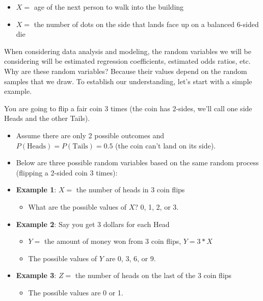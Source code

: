 \documentclass[
]{book}
\providecommand{\tightlist}{%
  \setlength{\itemsep}{0pt}\setlength{\parskip}{0pt}}
\begin{document}
\begin{itemize}
\tightlist
\item
  \(X =\) age of the next person to walk into the building
\item
  \(X =\) the number of dots on the side that lands face up on a balanced 6-sided die
\end{itemize}

When considering data analysis and modeling, the random variables we will be considering will be estimated regression coefficients, estimated odds ratios, etc. Why are these random variables? Because their values depend on the random samples that we draw. To establish our understanding, let's start with a simple example.

You are going to flip a fair coin 3 times (the coin has 2-sides, we'll call one side Heads and the other Tails).

\begin{itemize}
\item
  Assume there are only 2 possible outcomes and \(P(\text{Heads}) = P(\text{Tails}) = 0.5\) (the coin can't land on its side).
\item
  Below are three possible random variables based on the same random process (flipping a 2-sided coin 3 times):
\item
  \textbf{Example 1}: \(X =\) the number of heads in 3 coin flips

  \begin{itemize}
  \tightlist
  \item
    What are the possible values of \(X\)? 0, 1, 2, or 3.
  \end{itemize}
\item
  \textbf{Example 2}: Say you get 3 dollars for each Head

  \begin{itemize}
  \tightlist
  \item
    \(Y =\) the amount of money won from 3 coin flips, \(Y = 3*X\)
  \item
    The possible values of \(Y\) are 0, 3, 6, or 9.
  \end{itemize}
\item
  \textbf{Example 3}: \(Z =\) the number of heads on the last of the 3 coin flips

  \begin{itemize}
  \tightlist
  \item
    The possible values are 0 or 1.
  \end{itemize}
\end{itemize}
\end{document}

